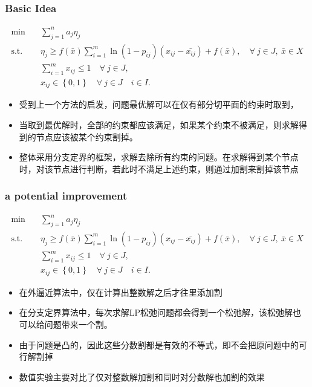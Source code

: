 \documentclass[10pt]{beamer}
\begin{document}
\begin{frame}
    \frametitle{Basic Idea}
    {\scriptsize
    
    \begin{align}
        \min\quad & \sum_{j=1}^n a_j \eta_j \\ 
        \mathrm{s. t.}\quad & \eta_j \geq f(\bar{x})\sum_{i = 1}^m \ln(1-p_{ij})(x_{ij} - \bar{x_{ij}}) + f(\bar{x}), \quad \forall ~ j \in J,\ \bar{x} \in X \\ 
        &\sum_{i=1}^m x_{ij} \leq 1\quad \forall ~ j \in J,\\
        & x_{ij} \in \left\{ 0,1 \right\} \quad \forall ~ j\in J\quad i \in I.
    \end{align}
    }
    \begin{itemize}
        \item 受到上一个方法的启发，问题最优解可以在仅有部分切平面的约束时取到，
        \item 当取到最优解时，全部的约束都应该满足，如果某个约束不被满足，则求解得到的节点应该被某个约束割掉。
        \item 整体采用分支定界的框架，求解去除所有约束的问题。在求解得到某个节点时，对该节点进行判断，若此时不满足上述约束，则通过加割来割掉该节点
    \end{itemize}
\end{frame}
\begin{frame}
    \frametitle{a potential improvement}
    {\scriptsize
    \begin{align}
        \min\quad & \sum_{j=1}^n a_j \eta_j \\ 
        \mathrm{s. t.}\quad & \eta_j \geq f(\bar{x})\sum_{i = 1}^m \ln(1-p_{ij})(x_{ij} - \bar{x_{ij}}) + f(\bar{x}), \quad \forall ~ j \in J,\ \bar{x} \in X \\ 
        &\sum_{i=1}^m x_{ij} \leq 1\quad \forall ~ j \in J,\\
        & x_{ij} \in \left\{ 0,1 \right\} \quad \forall ~ j\in J\quad i \in I.
    \end{align}
    }
    \begin{itemize}
        \item 在外逼近算法中，仅在计算出整数解之后才往里添加割
        \item 在分支定界算法中，每次求解LP松弛问题都会得到一个松弛解，该松弛解也可以给问题带来一个割。
        \item 由于问题是凸的，因此这些分数割都是有效的不等式，即不会把原问题中的可行解割掉
        \item 数值实验主要对比了仅对整数解加割和同时对分数解也加割的效果
    \end{itemize}
\end{frame}
\end{document}
